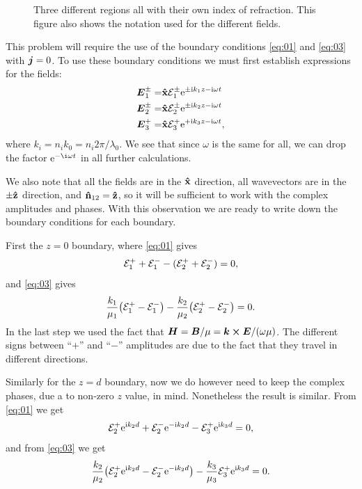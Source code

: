 \documentclass[11pt,letter, swedish, english
]{article}
\begin{document}
\begin{figure}
\centering
\resizebox{.6\textwidth}{!}{}
\caption{Three different regions all with their own index of
  refraction. This figure also shows the notation used for the
  different fields. }
\label{fig:1_geometry}
\end{figure}

This problem will require the use of the boundary conditions
\eqref{eq:01} and \eqref{eq:03} with $\vb*j=0$. To use
these boundary conditions we must first establish expressions for the
fields:
\begin{equation}
\begin{aligned}
\vb*E_1^\pm=&\vu{x}\mathcal{E}_1^\pm\mathrm{e}^{\pm\mathrm{i} k_1z -\mathrm{i}\omega t}\\
\vb*E_2^\pm=&\vu{x}\mathcal{E}_2^\pm\mathrm{e}^{\pm\mathrm{i} k_2z -\mathrm{i}\omega t}\\
\vb*E_3^{+}=&\vu{x}\mathcal{E}_3^+\mathrm{e}^{+\mathrm{i} k_3z -\mathrm{i}\omega t},
\end{aligned}
\end{equation}
where $k_i=n_ik_0=n_i2\pi/\lambda_0$. We see that since $\omega$
is the same for all, we can drop the factor $\ee^{-\i\omega t}$ in all
further calculations. 

We also note that all the fields are in the $\vu{x}$ direction, all
wavevectors are in the $\pm\vu{z}$ direction, and
$\vu{n}_{12}=\vu{z}$, so it will be sufficient to work with the
complex amplitudes and phases. With this observation we are ready to
write down the boundary conditions for each boundary. 

First the $z=0$ boundary, where \eqref{eq:01} gives
\begin{equation}
{\mathcal{E}_1^+}+{\mathcal{E}_1^-} -({\mathcal{E}_2^+}+{\mathcal{E}_2^-}) =0, 
\end{equation}
and \eqref{eq:03} gives
\begin{equation}
\frac{k_1}{\mu_1}\qty({\mathcal{E}_1^+}-{\mathcal{E}_1^-}) 
-\frac{k_2}{\mu_2}\qty({\mathcal{E}_2^+}-{\mathcal{E}_2^-}) =0.
\end{equation}
In the last step we used the fact that 
$\vb*H = \vb*B/\mu = \vb*k\cross\vb*E/(\omega\mu)$. The different
signs between ``$+$'' and ``$-$'' amplitudes are due to the fact that
they travel in different directions. 

Similarly for the $z=d$ boundary, now we do however need to keep the
complex phases, due a to non-zero $z$ value, in mind. Nonetheless the
result is similar. From \eqref{eq:01} we get
\begin{equation}
{\mathcal{E}_2^+}\mathrm{e}^{\mathrm{i} k_2d}+{\mathcal{E}_2^-}\mathrm{e}^{-\mathrm{i} k_2d} -{\mathcal{E}_3^+}\mathrm{e}^{\mathrm{i} k_3d} =0, 
\end{equation}
and from \eqref{eq:03} we get
\begin{equation}
\frac{k_2}{\mu_2}\qty({\mathcal{E}_2^+}\mathrm{e}^{\mathrm{i} k_2d}-{\mathcal{E}_2^-}\mathrm{e}^{-\mathrm{i} k_2d}) 
-\frac{k_3}{\mu_3}{\mathcal{E}_3^+}\mathrm{e}^{\mathrm{i} k_3d} =0.
\end{equation}
\end{document}
